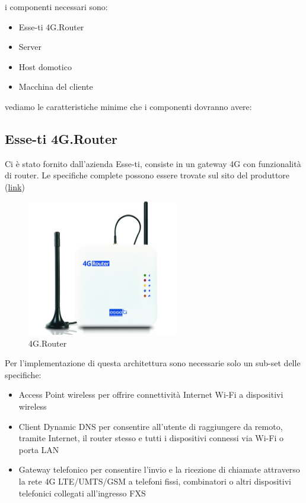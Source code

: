 i componenti necessari sono:

\begin{itemize}
	\item Esse-ti 4G.Router
	\item Server
	\item Host domotico
	\item Macchina del cliente
\end{itemize}

vediamo le caratteristiche minime che i componenti dovranno avere:

\subsection{Esse-ti 4G.Router}

Ci \`e stato fornito dall'azienda Esse-ti, consiste in un gateway 4G con funzionalità di router. Le specifiche complete possono essere trovate sul sito del produttore (\href{https://www.esse-ti.it/4g-router}{link})


\begin{figure}[ht]
	\centering
	\includegraphics[width=250px]{immagini/4grouter.jpg}
	\caption{4G.Router}

	\label{fig:esse-ti-router-4g}

\end{figure}

Per l'implementazione di questa architettura sono necessarie solo un sub-set delle specifiche:

\begin{itemize} %
	\item Access Point wireless per offrire connettività Internet Wi-Fi a dispositivi wireless
	\item Client Dynamic DNS per consentire all’utente di raggiungere da remoto, tramite Internet, il router stesso e tutti i dispositivi connessi via Wi-Fi o porta LAN
	\item Gateway telefonico per consentire l’invio e la ricezione di chiamate attraverso la rete 4G LTE/UMTS/GSM a telefoni fissi, combinatori o altri dispositivi telefonici collegati all’ingresso FXS
\end{itemize}

